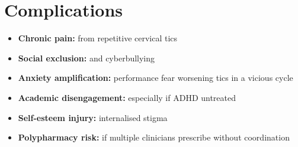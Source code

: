 \section*{Complications}
\begin{itemize}
    \item \textbf{Chronic pain:} from repetitive cervical tics
    \item \textbf{Social exclusion:} and cyberbullying
    \item \textbf{Anxiety amplification:} performance fear worsening tics in a vicious cycle
    \item \textbf{Academic disengagement:} especially if ADHD untreated
    \item \textbf{Self-esteem injury:} internalised stigma
    \item \textbf{Polypharmacy risk:} if multiple clinicians prescribe without coordination
\end{itemize}

